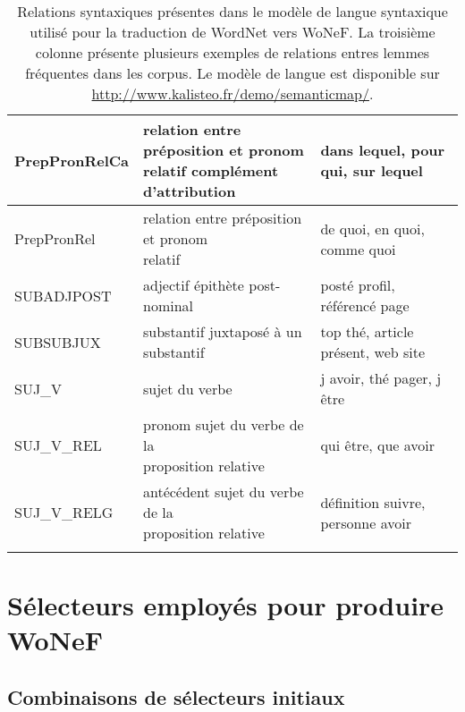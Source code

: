 \documentclass[oneside,parskip,draft]{scrbook}
\makeatletter
\newcommand{\specialcell}[2][l]{%
      \begin{tabular}[#1]{@{}l@{}}#2\end{tabular}}
\makeatother
\begin{document}
\begin{longtable}{lll}
    PrepPronRelCa &  \specialcell{relation entre préposition et pronom \\ relatif complément d'attribution} & dans lequel, pour qui, sur lequel  \\ \midrule
    PrepPronRel   &  \specialcell{relation entre préposition et pronom \\ relatif} & de quoi, en quoi, comme quoi \\ \midrule
    SUBADJPOST    &  adjectif épithète post-nominal        & posté profil, référencé page \\ \midrule
    SUBSUBJUX     &  substantif juxtaposé à un substantif  & top thé, article présent, web site \\ \midrule
    SUJ\_V        &  sujet du verbe                        & j avoir, thé pager, j être \\ \midrule
    SUJ\_V\_REL   &  \specialcell{pronom sujet du verbe de la \\ proposition relative} & qui être, que avoir \\ \midrule
    SUJ\_V\_RELG  &  \specialcell{antécédent sujet du verbe de la \\ proposition relative} & définition suivre, personne avoir \\
    \bottomrule

    \caption{\label{table:relationswonef}Relations syntaxiques présentes dans
        le modèle de langue syntaxique utilisé pour la traduction de WordNet
        vers WoNeF. La troisième colonne présente plusieurs exemples de
        relations entres lemmes fréquentes dans les corpus. Le modèle de langue
    est disponible sur \protect\url{http://www.kalisteo.fr/demo/semanticmap/}.}
\end{longtable}



\section{Sélecteurs employés pour produire WoNeF}

\subsection{Combinaisons de sélecteurs initiaux}
\end{document}
